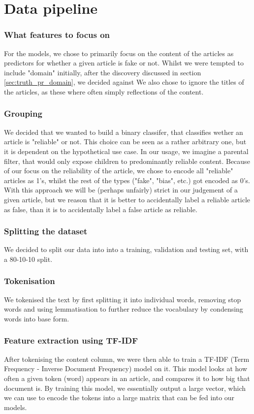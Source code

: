 \section*{Data pipeline}
\subsubsection{What features to focus on}
For the models, we chose to primarily focus on the content of the articles as predictors for whether a given article is
fake or not. Whilst we were tempted to include "domain" initially, after the discovery discussed in section \ref{sec:truth_pr_domain},
we decided against We also chose to ignore the titles of the articles, as these where often simply reflections of the
content.

\subsubsection{Grouping}
We decided that we wanted to build a binary classifer, that classifies wether an article is "reliable" or not. This choice can be seen as a rather arbitrary one, but it is dependent on the hypothetical use case. In our usage, we imagine a parental filter, that would only expose children to predominantly reliable content. Because of our focus on the reliability of
the article, we chose to encode all "reliable" articles as 1's, whilst the rest of the types ("fake", "bias", etc.) got
encoded as 0's. With this approach we will be (perhaps unfairly) strict in our judgement of a given article, but we
reason that it is better to accidentally label a reliable article as false, than it is to accidentally label a false
article as reliable.

\subsubsection{Splitting the dataset}
We decided to split our data into into a training, validation and testing set, with a 80-10-10 split.

\subsubsection{Tokenisation}
We tokenised the text by first splitting it into
individual words, removing stop words and using lemmatisation to further reduce the vocabulary by condensing words into
base form.

\subsubsection{Feature extraction using TF-IDF}
After tokenising the content column, we were then able to train a TF-IDF (Term Frequency - Inverse Document Frequency)
model on it. This model looks at how often a given token (word) appears in an article, and compares it to how big that
document is. By training this model, we essentially output a large vector, which we can use to encode the tokens into a
large matrix that can be fed into our models.

